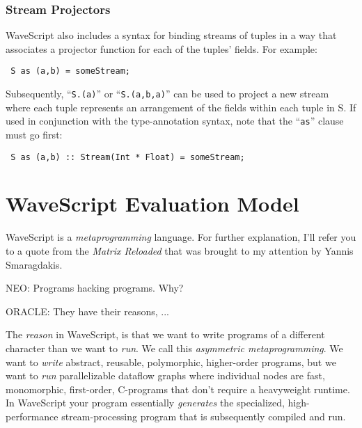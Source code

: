 \documentclass[twocolumn]{report}
\newenvironment{wscode}{\begin{center}\tt}{\end{center}}
\begin{document}
\subsection{Stream Projectors}

WaveScript also includes a syntax for binding streams of tuples in a
 way that associates a projector function for each of
the tuples' fields.  For example:

\begin{wscode}
S as (a,b) = someStream;
\end{wscode}

Subsequently, ``{\tt S.(a)}'' or ``{\tt S.(a,b,a)}'' can be used to
project a new stream where each tuple represents an arrangement of
the fields within each tuple in {S}.  If used in conjunction with the
type-annotation syntax, note that the ``{\tt as}'' clause must go first:

\begin{wscode}
S as (a,b) :: Stream(Int * Float) = someStream;
\end{wscode}








\chapter{WaveScript Evaluation Model}
\label{s:evalmodel}

WaveScript is a {\em metaprogramming} language.  For further
explanation, I'll refer you to a quote from the {\em Matrix Reloaded}
that was brought to my attention by Yannis Smaragdakis.

\begin{center}
NEO: Programs hacking programs. Why?

ORACLE: They have their reasons, ...
\end{center}

The {\em reason} in WaveScript, is that we want to write programs of a
different character than we want to {\em run}.  We call this {\em asymmetric metaprogramming}.
We want to {\em write}
abstract, reusable, polymorphic, higher-order programs, but we want to
{\em run} parallelizable dataflow graphs where individual nodes are
fast, monomorphic, first-order, C-programs that don't require
a heavyweight runtime.
In WaveScript your program essentially {\em
generates} the specialized, high-performance stream-processing
program that is subsequently compiled and run.  
\end{document}

